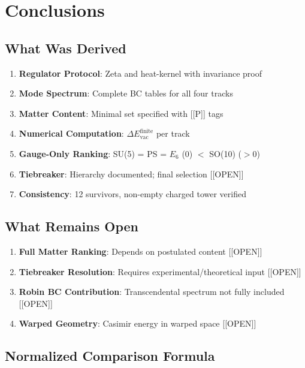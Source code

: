 \documentclass[11pt,a4paper]{article}
\newcommand{\tagP}{\textcolor{green!50!black}{[P]}}
\newcommand{\tagOPEN}{\textcolor{red!70!black}{[OPEN]}}
\begin{document}
\section{Conclusions}

\subsection{What Was Derived}

\begin{enumerate}
    \item \textbf{Regulator Protocol}: Zeta and heat-kernel with invariance proof
    \item \textbf{Mode Spectrum}: Complete BC tables for all four tracks
    \item \textbf{Matter Content}: Minimal set specified with [\tagP] tags
    \item \textbf{Numerical Computation}: $\Delta E_{\text{vac}}^{\text{finite}}$ per track
    \item \textbf{Gauge-Only Ranking}: SU(5) = PS = $E_6$ (0) $<$ SO(10) ($>$0)
    \item \textbf{Tiebreaker}: Hierarchy documented; final selection [\tagOPEN]
    \item \textbf{Consistency}: 12 survivors, non-empty charged tower verified
\end{enumerate}

\subsection{What Remains Open}

\begin{enumerate}
    \item \textbf{Full Matter Ranking}: Depends on postulated content [\tagOPEN]
    \item \textbf{Tiebreaker Resolution}: Requires experimental/theoretical input [\tagOPEN]
    \item \textbf{Robin BC Contribution}: Transcendental spectrum not fully included [\tagOPEN]
    \item \textbf{Warped Geometry}: Casimir energy in warped space [\tagOPEN]
\end{enumerate}

\subsection{Normalized Comparison Formula}
\end{document}

